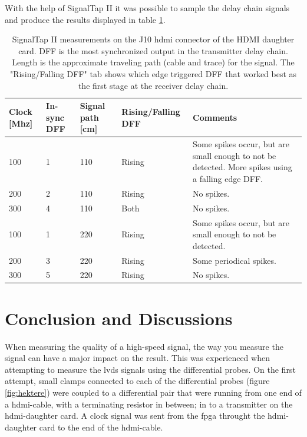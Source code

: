\documentclass[main.tex]{subfiles}
\begin{document}
With the help of SignalTap II it was possible to sample the delay chain signals and produce the results displayed in table \ref{tab:delch}. 
\begin{table}[!b]
\centering
\caption{SignalTap II measurements on the J10 hdmi connector of the HDMI daughter card. DFF is the most synchronized output in the transmitter delay chain. Length is the approximate traveling path (cable and trace) for the signal. The "Rising/Falling DFF" tab shows which edge triggered DFF that worked best as the first stage at the receiver delay chain.}
\label{tab:delch}
\begin{tabular}{|p{1cm}|p{1.5cm}|p{2cm}|p{2.5cm}|p{5cm}|}
\hline
 Clock [Mhz]  & In-sync DFF   & Signal path [cm]   & Rising/Falling DFF  & Comments \\ \hline
 100          & 1     & 110           & Rising              & Some spikes occur, but are small enough to not be detected. More spikes using a falling edge DFF.  \\ \hline
 200          & 2     & 110           & Rising              & No spikes. \\ \hline
 300          & 4     & 110           & Both              & No spikes. \\ \hline
 100          & 1     & 220           & Rising              & Some spikes occur, but are small enough to not be detected.\\ \hline
 200          & 3     & 220           & Rising              & Some periodical spikes.\\ \hline
 300          & 5     & 220           & Rising              & No spikes.\\ \hline
\end{tabular}
\end{table}


\section{Conclusion and Discussions}

When measuring the quality of a high-speed signal, the way you measure the signal can have a major impact on the result. This was experienced when attempting to measure the \gls{lvds} signals using the differential probes. On the first attempt, small clamps connected to each of the differential probes (figure \ref{fig:hektere}) were coupled to a differential pair that were running from one end of a hdmi-cable, with a terminating resistor in between; in to a transmitter on the \gls{hdmi}-daughter card. A clock signal was sent from the \gls{fpga} throught the \gls{hdmi}-daughter card to the end of the hdmi-cable. 
\end{document}
